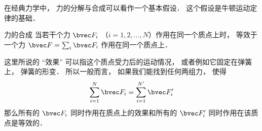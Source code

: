 

在经典力学中， 力的分解与合成可以看作一个基本假设． 这个假设是牛顿运动定律的基础．

\begin{theorem}{力的合成}
当若干个力 $\bvec F_i$ （$i = 1, 2, \dots, N$）作用在同一个质点上时， 等效于一个力 $\bvec F = \sum_i \bvec F_i$ 作用在同一个质点上．
\end{theorem}
这里所说的 “效果” 可以指这个质点受力后的运动情况， 或者例如它固定在弹簧上， 弹簧的形变． 所以一般而言， 如果我们能找到任何两组力， 使得
\begin{equation}
\sum_{i=1}^N \bvec F_i = \sum_{i=1}^{N'} \bvec F'_i
\end{equation}
那么所有的 $\bvec F_i$ 同时作用在质点上的效果和所有的 $\bvec F'_i$ 同时作用在该质点是等效的．

